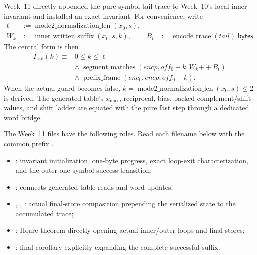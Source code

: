 Week~11 directly appended the pure symbol-tail trace to Week~10's local inner
invariant and installed an exact invariant. For convenience, write
\[
\begin{aligned}
 \ell&:=\operatorname{mode2\_normalization\_len}(x_0,s),\\
 W_k&:=\operatorname{inner\_written\_suffix}(x_0,s,k),&
 B_t&:=\operatorname{encode\_trace}(tail).\mathsf{bytes}
\end{aligned}
\]
The central form is then
\[
\begin{aligned}
 I_{\mathrm{tail}}(k) \equiv{}&
 0\le k\le \ell\\
 &\land\;\operatorname{segment\_matches}\!\left(
   encp,off_0-k,W_k\mathbin{++}B_t\right)\\
 &\land\;\operatorname{prefix\_frame}(enc_0,encp,off_0-k).
\end{aligned}
\]
When the actual guard becomes false,
\(k=\operatorname{mode2\_normalization\_len}(x_0,s)\le2\) is derived. The
generated table's \(x_{\max}\), reciprocal, bias, packed complement/shift values,
and shift ladder are equated with the pure fast step through a dedicated
word bridge.

The Week~11 files have the following roles. Read each filename below with the
common prefix .
\begin{itemize}
  \item {}: invariant initialization, one-byte
        progress, exact loop-exit characterization, and the outer one-symbol success transition;
  \item {}: connects generated table reads
        and word updates;
  \item {},
        ,
        : actual final-store composition
        prepending the serialized state to the accumulated trace;
  \item {}: Hoare theorem directly opening
        actual inner/outer loops and final stores;
  \item {}: final corollary explicitly expanding
        the complete successful suffix.
\end{itemize}

